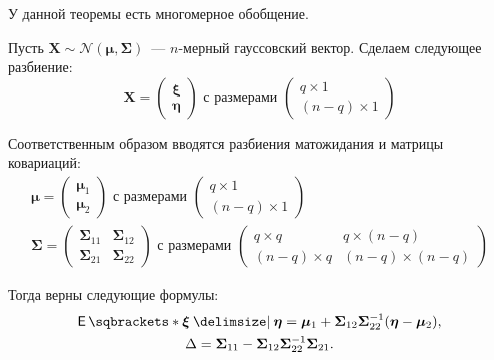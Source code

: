 У данной теоремы есть многомерное обобщение.
\begin{theorem}
	Пусть \(\mathbf{X} \sim \mathcal{N}(\bm{\mu}, \bm{\Sigma})\)~--- 
	\(n\)-мерный гауссовский вектор. Сделаем следующее разбиение:
	\[
		\mathbf{X} = \begin{pmatrix}
		\bm{\xi} \\ \bm{\eta}
		\end{pmatrix} \text{ с размерами }
		\begin{pmatrix}
		q \times 1 \\
		(n - q) \times 1
		\end{pmatrix}
	\]
	
	Соответственным образом вводятся разбиения матожидания и матрицы ковариаций:
	\begin{gather}
		\bm{\mu} = \begin{pmatrix}
		\bm{\mu}_{1} \\ \bm{\mu}_{2}
		\end{pmatrix} \text{ с размерами }
		\begin{pmatrix}
		q \times 1 \\
		(n - q) \times 1
		\end{pmatrix} \\
		\bm{\Sigma} = \begin{pmatrix}
		\bm{\Sigma}_{11} & \bm{\Sigma}_{12} \\
		\bm{\Sigma}_{21} & \bm{\Sigma}_{22}
		\end{pmatrix} \text{ с размерами }
		\begin{pmatrix}
		q \times q & q \times (n - q) \\
		(n - q) \times q & (n - q) \times (n - q)
		\end{pmatrix}
	\end{gather}
	
	Тогда верны следующие формулы:
	\begin{gather}
		\E{\bm{\xi} \given \bm{\eta}} = \bm{\mu}_{1} + 
		\bm{\Sigma}_{12}\bm{\Sigma}_{22}^{-1}(\bm{\eta} - \bm{\mu}_{2}), \\
		\Delta = \bm{\Sigma}_{11} - 
		\bm{\Sigma}_{12}\bm{\Sigma}_{22}^{-1}\bm{\Sigma}_{21}.
	\end{gather}
\end{theorem}
